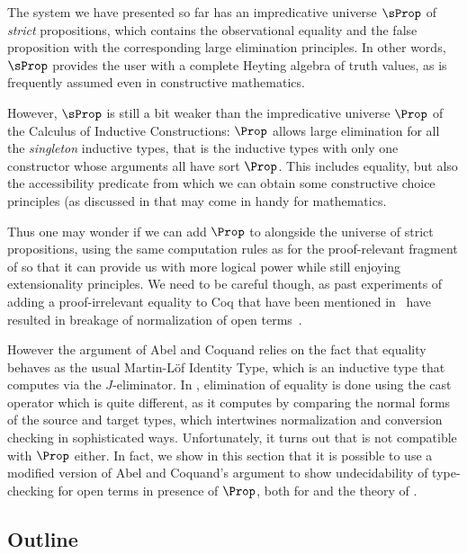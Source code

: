   The system we have presented so far has an impredicative universe
  \( \sProp \) of \emph{strict} propositions, which contains the observational
  equality and the false proposition with the corresponding large
  elimination principles.
  In other words, \( \sProp \) provides the user with a complete Heyting
  algebra of truth values, as is frequently assumed even in constructive
  mathematics.
  
  However, \( \sProp \) is still a bit weaker than the impredicative
  universe \( \Prop \) of the Calculus of Inductive Constructions:
  \( \Prop \) allows large elimination for all the \emph{singleton}
  inductive types, that is the inductive types with only one constructor
  whose arguments all have sort \( \Prop \).
  This includes equality, but also the accessibility predicate from which
  we can obtain some constructive choice principles (as discussed in  that may
  come in handy for mathematics.
  
  Thus one may wonder if we can add \( \Prop \) to \SetoidCC alongside the
  universe of strict propositions, using the same computation rules as for the
  proof-relevant fragment of \SetoidCC so that it can provide us with
  more logical power while still enjoying extensionality principles.
  We need to be careful though, as past experiments of adding a
  proof-irrelevant equality to Coq that have been mentioned
  in~ have resulted in breakage of
  normalization of open terms~.
  
  However the argument of Abel and Coquand relies on the fact that
  equality behaves as the usual Martin-Löf Identity Type, which is an
  inductive type that computes via the \( J \)-eliminator.
  In \SetoidCC, elimination of equality is done using the cast operator
  which is quite different, as it computes by comparing the normal forms
  of the source and target types, which intertwines normalization and
  conversion checking in sophisticated ways.
  Unfortunately, it turns out that \SetoidCC is not compatible with \( \Prop \)
  either.
  In fact, we show in this section that it is possible to use a modified
  version of Abel and Coquand's argument to show undecidability of
  type-checking for open terms in presence of \( \Prop \), both for
  \SetoidCC and the theory of .
  
  \subsection{Outline}
  
